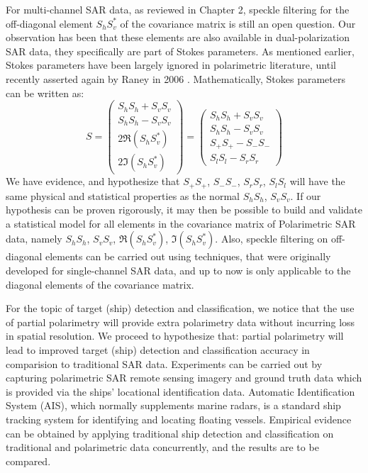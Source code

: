 For multi-channel SAR data, as reviewed in Chapter 2, speckle filtering for the off-diagonal element $S_hS_v^*$ of the covariance matrix is still an open question.
Our observation has been that these elements are also available in dual-polarization SAR data, they specifically are part of Stokes parameters.
As mentioned earlier, Stokes parameters have been largely ignored in polarimetric literature, until recently asserted again by Raney in 2006 \cite{Raney_2006_IGARSS}.
Mathematically, Stokes parameters can be written as:
\begin{equation}
S = 
\left(
	\begin{array} {c}
		S_hS_h + S_vS_v \\
		S_hS_h - S_vS_v \\
		2 \Re{(S_hS_v^*)} \\
		2 \Im{(S_hS_v^*)}
	\end{array}
\right)
= 
\left(
	\begin{array} {c}
		S_hS_h + S_vS_v \\
		S_hS_h - S_vS_v \\
		S_+S_+ - S_-S_- \\
		S_lS_l - S_rS_r
	\end{array}
\right)
\end{equation}
We have evidence, and hypothesize that $S_+S_+$, $S_-S_-$, $S_rS_r$, $S_lS_l$ will have the same physical and statistical properties as the normal $S_hS_h$, $S_vS_v$.
If our hypothesis can be proven rigorously, it may then be possible to build and validate a statistical model for all elements in the covariance matrix of Polarimetric SAR data, namely $S_hS_h$, $S_vS_v$, $\Re{( S_hS_v^*)}$, $\Im{( S_hS_v^* )}$.
Also, speckle filtering on off-diagonal elements can be carried out using techniques, that were originally developed for single-channel SAR data, and up to now is only applicable to the diagonal elements of the covariance matrix.

For the topic of target (ship) detection and classification, we notice that the use of partial polarimetry will provide extra polarimetry data without incurring loss in spatial resolution.
We proceed to hypothesize that: partial polarimetry will lead to improved target (ship) detection and classification accuracy in comparision to traditional SAR data.
Experiments can be carried out by capturing polarimetric SAR remote sensing imagery and ground truth data which is provided via the ships' locational identification data.
Automatic Identification System (AIS), which normally supplements marine radars, is a standard ship tracking system for identifying and locating floating vessels.
Empirical evidence can be obtained by applying traditional ship detection and classification on traditional and polarimetric data concurrently, and the results are to be compared.

